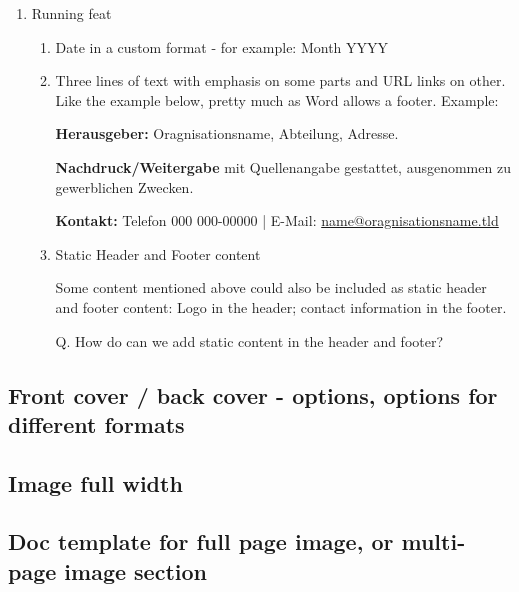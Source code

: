\documentclass{article}
\begin{document}
\begin{enumerate}
\begin{enumerate}
\begin{enumerate}
\end{enumerate}

\item Running feat

\begin{enumerate}
\item Date in a custom format - for example: Month YYYY


\item Three lines of text with emphasis on some parts and URL links on other. Like the example below, pretty much as Word allows a footer. Example:


\textbf{Herausgeber:} Oragnisationsname, Abteilung, Adresse.


\textbf{Nachdruck/Weitergabe} mit Quellenangabe gestattet, ausgenommen zu gewerblichen Zwecken.


\textbf{Kontakt:} Telefon 000 000-00000 | E-Mail: \href{mailto:info@org.tld}{name@oragnisationsname.tld}


\item Static Header and Footer content


Some content mentioned above could also be included as static header and footer content: Logo in the header; contact information in the footer.


Q. How do can we add static content in the header and footer?


\end{enumerate}

\end{enumerate}

\end{enumerate}

\subsection{Front cover / back cover - options, options for different formats}\label{H2066845}



\subsection{Image full width}\label{H4254322}



\subsection{Doc template for full page image, or multi-page image section}\label{H160759}
\end{document}
